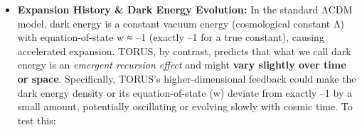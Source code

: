 \documentclass[
]{article}
\begin{document}
\begin{itemize}
\item
  \textbf{Expansion History \& Dark Energy Evolution:} In the standard
  ΛCDM model, dark energy is a constant vacuum energy (cosmological
  constant Λ) with equation-of-state w ≈ --1 (exactly --1 for a true
  constant), causing accelerated expansion. TORUS, by contrast, predicts
  that what we call dark energy is an \emph{emergent recursion effect}
  and might \textbf{vary slightly over time or space}\hspace{0pt}.
  Specifically, TORUS's higher-dimensional feedback could make the dark
  energy density or its equation-of-state (w) deviate from exactly --1
  by a small amount, potentially oscillating or evolving slowly with
  cosmic time\hspace{0pt}. To test this:


\end{itemize}
\end{document}

